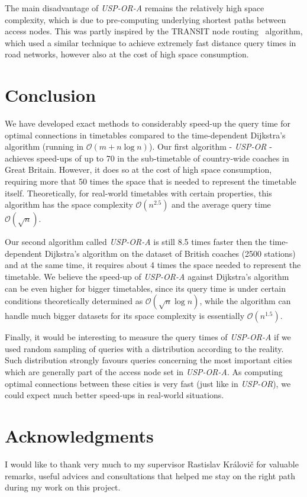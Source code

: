 \documentclass{svk_long_en}
\newcommand{\indt}{\hspace{6ex}}
\begin{document}
	\indt The main disadvantage of \textit{USP-OR-A} remains the relatively high space complexity, which is due to pre-computing underlying shortest paths between access nodes. This was partly inspired by the TRANSIT node routing~\cite{transit06} algorithm, which used a similar technique to achieve extremely fast distance query times in road networks, however also at the cost of high space consumption.

\section{Conclusion}

	We have developed exact methods to considerably speed-up the query time for optimal connections in timetables compared to the time-dependent Dijkstra's algorithm (running in $\mathcal{O}(m + n \log n)$). Our first algorithm - \textit{USP-OR} - achieves speed-ups of up to 70 in the sub-timetable of country-wide coaches in Great Britain. However, it does so at the cost of high space consumption, requiring more that 50 times the space that is needed to represent the timetable itself. Theoretically, for real-world timetables with certain properties, this algorithm has the space complexity $\mathcal{O}(n^{2.5})$ and the average query time $\mathcal{O}(\sqrt{n})$.
	
	\indt Our second algorithm called \textit{USP-OR-A} is still 8.5 times faster then the time-dependent Dijkstra's algorithm on the dataset of British coaches (2500 stations) and at the same time, it requires about 4 times the space needed to represent the timetable. We believe the speed-up of \textit{USP-OR-A} against Dijkstra's algorithm can be even higher for bigger timetables, since its query time is under certain conditions theoretically determined as $\mathcal{O}(\sqrt{n} \log n)$, while the algorithm can handle much bigger datasets for its space complexity is essentially $\mathcal{O}(n^{1.5})$. 
	
	\indt Finally, it would be interesting to measure the query times of \textit{USP-OR-A} if we used random sampling of queries with a distribution according to the reality. Such distribution strongly favours queries concerning the most important cities which are generally part of the access node set in \textit{USP-OR-A}. As computing optimal connections between these cities is very fast (just like in \textit{USP-OR}), we could expect much better speed-ups in real-world situations.

\section*{Acknowledgments}
	I would like to thank very much to my supervisor Rastislav Královič for valuable remarks, useful advices and consultations that helped me stay on the right path during my work on this project.
\end{document}
